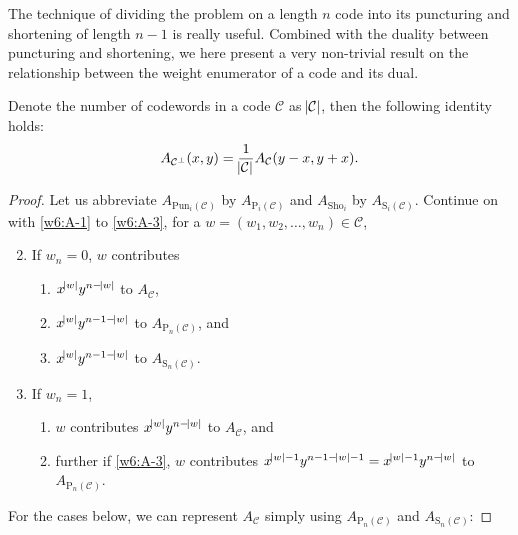The technique of dividing the problem on a length $n$ code into its puncturing and shortening of length $n-1$ is really useful. Combined with the duality between puncturing and shortening, we here present a very non-trivial result on the relationship between the weight enumerator of a code and its dual.

\begin{theorem} \label{thm:w6_McWilliams}
    Denote the number of codewords in a code $\mathcal{C}$ as $\abs{\mathcal{C}}$, then the following identity holds:
    \begin{equation}
        A_{\mathcal{C}^\perp}(x,y) = \frac{1}{\abs{\mathcal{C}}} A_\mathcal{C}(y-x,y+x).
    \end{equation}
\end{theorem}
\begin{proof}
    Let us abbreviate $A_{\mathrm{Pun}_i(\mathcal{C})}$ by $A_{\mathrm{P}_i(\mathcal{C})}$ and $A_{\mathrm{Sho}_i}$ by $A_{\mathrm{S}_i(\mathcal{C})}$. Continue on with \ref{w6:A-1} to \ref{w6:A-3}, for a $w=(w_1,w_2,\ldots,w_n)\in\mathcal{C}$,
    \begin{enumerate}[label=(\Alph*)]
        \setcounter{enumi}{1}
        \item 
        If $w_n=0$, $w$ contributes 
        \begin{enumerate}[label=(B\arabic*)]
            \item \label{w6:B-1}
            $x^{\abs{w}}y^{n-\abs{w}}$ to $A_\mathcal{C}$,
            \item \label{w6:B-2}
            $x^{\abs{w}}y^{n-1-\abs{w}}$ to $A_{\mathrm{P}_n(\mathcal{C})}$, and 
            \item \label{w6:B-3}
            $x^{\abs{w}}y^{n-1-\abs{w}}$ to $A_{\mathrm{S}_n(\mathcal{C})}$.
        \end{enumerate}
        \item If $w_n=1$,
        \begin{enumerate}[label=(C\arabic*)]
            \item \label{w6:C-1}
            $w$ contributes $x^{\abs{w}}y^{n-\abs{w}}$ to $A_\mathcal{C}$, and
            \item \label{w6:C-2}
            further if \ref{w6:A-3}, $w$ contributes $x^{\abs{w}-1}y^{n-1-\abs{w}-1}=x^{\abs{w}-1}y^{n-\abs{w}}$ to $A_{\mathrm{P}_n(\mathcal{C})}$.
        \end{enumerate}
    \end{enumerate}
    For the cases below, we can represent $A_\mathcal{C}$ simply using $A_{\mathrm{P}_n(\mathcal{C})}$ and $A_{\mathrm{S}_n(\mathcal{C})}$:

\end{proof}
